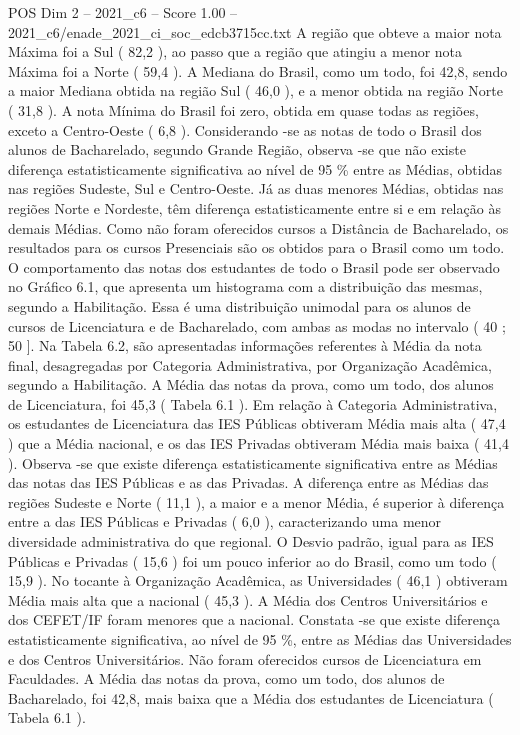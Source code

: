 \begin{textsample}{POS Dim 2 – 2021\_c6 – Score 1.00 – 2021\_c6/enade\_2021\_ci\_soc\_edcb3715cc.txt}
A região que obteve a maior nota Máxima foi a Sul ( 82,2 ), ao passo que a região que atingiu a menor nota Máxima foi a Norte ( 59,4 ).
A Mediana do Brasil, como um todo, foi 42,8, sendo a maior Mediana obtida na região Sul ( 46,0 ), e a menor obtida na região Norte ( 31,8 ).
A nota Mínima do Brasil foi zero, obtida em quase todas as regiões, exceto a Centro-Oeste ( 6,8 ).
Considerando -se as notas de todo o Brasil dos alunos de Bacharelado, segundo Grande Região, observa -se que não existe diferença estatisticamente significativa ao nível de 95 \% entre as Médias, obtidas nas regiões Sudeste, Sul e Centro-Oeste.
Já as duas menores Médias, obtidas nas regiões Norte e Nordeste, têm diferença estatisticamente entre si e em relação às demais Médias.
Como não foram oferecidos cursos a Distância de Bacharelado, os resultados para os cursos Presenciais são os obtidos para o Brasil como um todo.
O comportamento das notas dos estudantes de todo o Brasil pode ser observado no Gráfico 6.1, que apresenta um histograma com a distribuição das mesmas, segundo a Habilitação.
Essa é uma distribuição unimodal para os alunos de cursos de Licenciatura e de Bacharelado, com ambas as modas no intervalo ( 40 ; 50 ].
Na Tabela 6.2, são apresentadas informações referentes à Média da nota final, desagregadas por Categoria Administrativa, por Organização Acadêmica, segundo a Habilitação.
A Média das notas da prova, como um todo, dos alunos de Licenciatura, foi 45,3 ( Tabela 6.1 ).
Em relação à Categoria Administrativa, os estudantes de Licenciatura das IES Públicas obtiveram Média mais alta ( 47,4 ) que a Média nacional, e os das IES Privadas obtiveram Média mais baixa ( 41,4 ).
Observa -se que existe diferença estatisticamente significativa entre as Médias das notas das IES Públicas e as das Privadas.
A diferença entre as Médias das regiões Sudeste e Norte ( 11,1 ), a maior e a menor Média, é superior à diferença entre a das IES Públicas e Privadas ( 6,0 ), caracterizando uma menor diversidade administrativa do que regional.
O Desvio padrão, igual para as IES Públicas e Privadas ( 15,6 ) foi um pouco inferior ao do Brasil, como um todo ( 15,9 ).
No tocante à Organização Acadêmica, as Universidades ( 46,1 ) obtiveram Média mais alta que a nacional ( 45,3 ).
A Média dos Centros Universitários e dos CEFET/IF foram menores que a nacional.
Constata -se que existe diferença estatisticamente significativa, ao nível de 95 \%, entre as Médias das Universidades e dos Centros Universitários.
Não foram oferecidos cursos de Licenciatura em Faculdades.
A Média das notas da prova, como um todo, dos alunos de Bacharelado, foi 42,8, mais baixa que a Média dos estudantes de Licenciatura ( Tabela 6.1 ).

\end{textsample}
